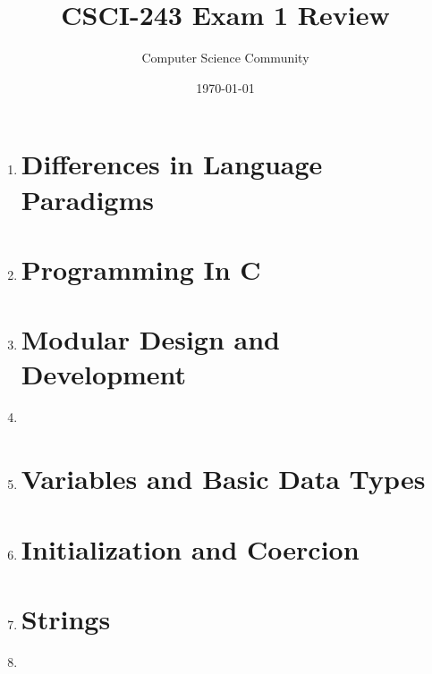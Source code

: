 \documentclass[11pt]{article}
\title{CSCI-243 Exam 1 Review}
\author{Computer Science Community}
\date{\today}
\begin{document}
\header

\begin{enumerate}

\section*{History and Evolution of Programming Languages}

	\item 

\section*{Differences in Language Paradigms}

	\item 

\section*{Programming In C}

	\item 

\newpage
\section*{Modular Design and Development}

	\item 
	\item 

\section*{Variables and Basic Data Types}

	\item 

\newpage
\section*{Initialization and Coercion}

	\item 

\section*{Strings}
	\item 


\end{enumerate}
\end{document}
